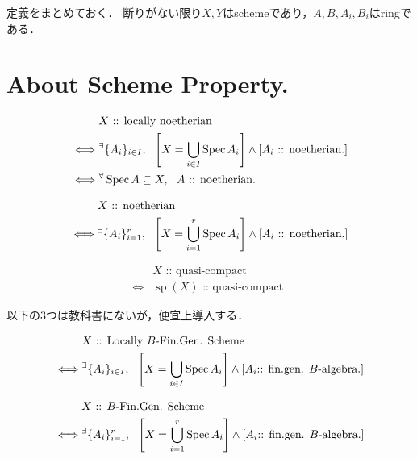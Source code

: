 \documentclass[a4paper]{jsarticle}
\begin{document}
定義をまとめておく．
断りがない限り$X,Y$はschemeであり，$A,B,A_i, B_i$はringである．

\section{About Scheme Property.}
\begin{Def}
\begin{align*}
    {}&     X\text{ :: locally noetherian } \\
    \iff&
            {}^{\exists} \{A_i\}_{i \in I},~~
            \left[X=\bigcup_{i \in I} \operatorname{Spec} A_i\right] \land \left[A_i\text{ :: noetherian.}\right] \\
    \iff&   {}^{\forall} \operatorname{Spec} A \subseteq X,~~ A\text{ :: noetherian.}
\end{align*}
\end{Def}

\begin{Def}
\begin{align*}
    {}&     X\text{ :: noetherian } \\
    \iff&   {}^{\exists} \{A_i\}_{i=1}^r,~~
            \left[X=\bigcup_{i=1}^r \operatorname{Spec} A_i\right] \land \left[A_i\text{ :: noetherian.}\right]
\end{align*}
\end{Def}

\begin{Def}
\begin{align*}
    {}&     X\text{ :: quasi-compact } \\
    \iff&   \operatorname{sp}(X)\text{ :: quasi-compact }
\end{align*}
\end{Def}

以下の3つは教科書にないが，便宜上導入する．
\begin{Def}
\begin{align*}
    {}&     X\text{ :: Locally $B$-Fin.Gen. Scheme} \\
    \iff&
            {}^{\exists} \{A_i\}_{i \in I},~~
            \left[X=\bigcup_{i \in I} \operatorname{Spec} A_i\right] \land \left[A_i\text{:: fin.gen. $B$-algebra.}\right]
\end{align*}
\end{Def}

\begin{Def}
\begin{align*}
    {}&     X\text{ :: $B$-Fin.Gen. Scheme} \\
    \iff&  
            {}^{\exists} \{A_i\}_{i=1}^r,~~
            \left[X=\bigcup_{i=1}^r \operatorname{Spec} A_i\right] \land \left[A_i\text{:: fin.gen. $B$-algebra.}\right]
\end{align*}
\end{Def}
\end{document}
